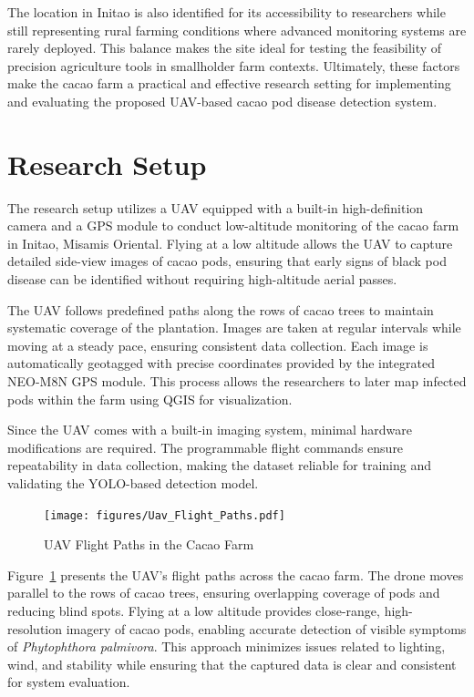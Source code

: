 The location in Initao is also identified for its accessibility to researchers while still representing rural farming conditions where advanced monitoring systems are rarely deployed. 
This balance makes the site ideal for testing the feasibility of precision agriculture tools in smallholder farm contexts. 
Ultimately, these factors make the cacao farm a practical and effective research setting for implementing and evaluating the proposed UAV-based cacao pod disease detection system.


\section{Research Setup}

The research setup utilizes a UAV equipped with a built-in high-definition camera and a GPS module to conduct low-altitude monitoring of the cacao farm in Initao, Misamis Oriental. 
Flying at a low altitude allows the UAV to capture detailed side-view images of cacao pods, ensuring that early signs of black pod disease can be identified without requiring high-altitude aerial passes.

The UAV follows predefined paths along the rows of cacao trees to maintain systematic coverage of the plantation. 
Images are taken at regular intervals while moving at a steady pace, ensuring consistent data collection. 
Each image is automatically geotagged with precise coordinates provided by the integrated NEO-M8N GPS module. 
This process allows the researchers to later map infected pods within the farm using QGIS for visualization.

Since the UAV comes with a built-in imaging system, minimal hardware modifications are required. 
The programmable flight commands ensure repeatability in data collection, making the dataset reliable for training and validating the YOLO-based detection model.

\begin{figure}[H]
	\centering
	\caption{UAV Flight Paths in the Cacao Farm}
	\label{fig:uav_flight_paths}
	\texttt{[image: figures/Uav\_Flight\_Paths.pdf]}
\end{figure}

Figure~\ref{fig:uav_flight_paths} presents the UAV’s flight paths across the cacao farm. 
The drone moves parallel to the rows of cacao trees, ensuring overlapping coverage of pods and reducing blind spots. 
Flying at a low altitude provides close-range, high-resolution imagery of cacao pods, enabling accurate detection of visible symptoms of \textit{Phytophthora palmivora}. 
This approach minimizes issues related to lighting, wind, and stability while ensuring that the captured data is clear and consistent for system evaluation.



